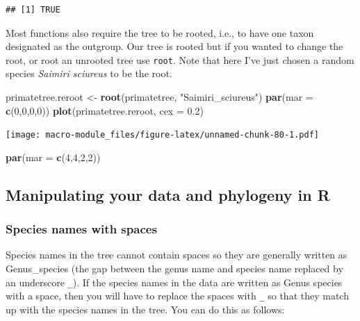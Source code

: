\documentclass[]{book}
\newenvironment{Shaded}{\begin{snugshade}}{\end{snugshade}}
\newcommand{\KeywordTok}[1]{\textcolor[rgb]{0.13,0.29,0.53}{\textbf{{#1}}}}
\newcommand{\DataTypeTok}[1]{\textcolor[rgb]{0.13,0.29,0.53}{{#1}}}
\newcommand{\DecValTok}[1]{\textcolor[rgb]{0.00,0.00,0.81}{{#1}}}
\newcommand{\FloatTok}[1]{\textcolor[rgb]{0.00,0.00,0.81}{{#1}}}
\newcommand{\StringTok}[1]{\textcolor[rgb]{0.31,0.60,0.02}{{#1}}}
\newcommand{\NormalTok}[1]{{#1}}
\begin{document}
\begin{verbatim}
## [1] TRUE
\end{verbatim}

Most functions also require the tree to be rooted, i.e., to have one
taxon designated as the outgroup. Our tree is rooted but if you wanted
to change the root, or root an unrooted tree use \texttt{root}. Note
that here I've just chosen a random species \emph{Saimiri sciureus} to
be the root.

\begin{Shaded}
\begin{Highlighting}[]
\NormalTok{primatetree.reroot <-}\StringTok{ }\KeywordTok{root}\NormalTok{(primatetree, }\StringTok{"Saimiri_sciureus"}\NormalTok{)}
\KeywordTok{par}\NormalTok{(}\DataTypeTok{mar =} \KeywordTok{c}\NormalTok{(}\DecValTok{0}\NormalTok{,}\DecValTok{0}\NormalTok{,}\DecValTok{0}\NormalTok{,}\DecValTok{0}\NormalTok{))}
\KeywordTok{plot}\NormalTok{(primatetree.reroot, }\DataTypeTok{cex =} \FloatTok{0.2}\NormalTok{)}
\end{Highlighting}
\end{Shaded}

\texttt{[image: macro-module\_files/figure-latex/unnamed-chunk-80-1.pdf]}

\begin{Shaded}
\begin{Highlighting}[]
\KeywordTok{par}\NormalTok{(}\DataTypeTok{mar =} \KeywordTok{c}\NormalTok{(}\DecValTok{4}\NormalTok{,}\DecValTok{4}\NormalTok{,}\DecValTok{2}\NormalTok{,}\DecValTok{2}\NormalTok{))}
\end{Highlighting}
\end{Shaded}

\subsection{Manipulating your data and phylogeny in
R}\label{manipulating-your-data-and-phylogeny-in-r}

\subsubsection{Species names with
spaces}\label{species-names-with-spaces}

Species names in the tree cannot contain spaces so they are generally
written as Genus\_species (the gap between the genus name and species
name replaced by an underscore \texttt{\_}). If the species names in the
data are written as Genus species with a space, then you will have to
replace the spaces with \texttt{\_} so that they match up with the
species names in the tree. You can do this as follows:
\end{document}
